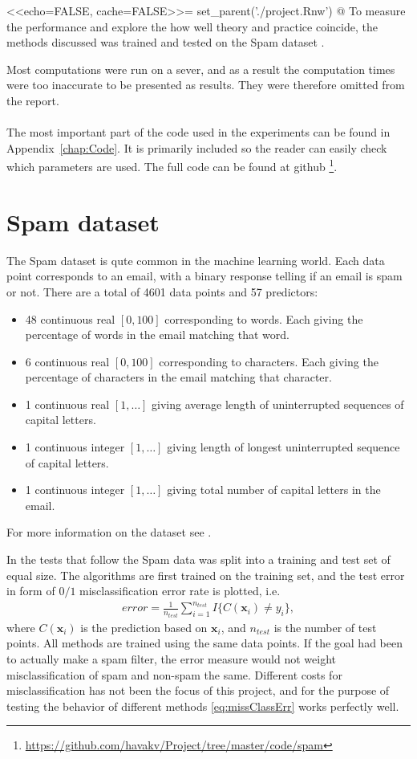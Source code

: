 <<echo=FALSE, cache=FALSE>>=
set_parent('./project.Rnw')
@
%
To measure the performance and explore the how well theory and practice coincide, the methods discussed was trained and tested on the Spam dataset \citep{Spamdata}. 

Most computations were run on a sever, and as a result the computation times were too inaccurate to be presented as results. They were therefore omitted from the report.
\\
\\
The most important part of the code used in the experiments can be found in Appendix~\ref{chap:Code}. It is primarily included so the reader can easily check which parameters are used. The full code can be found at github \footnote{\url{https://github.com/havakv/Project/tree/master/code/spam}}.


\section{Spam dataset}
\label{sec:Spam dataset}
 The Spam dataset is qute common in the machine learning world. 
 Each data point corresponds to an email, with a binary response telling if an email is spam or not. There are a total of 4601 data points and 57 predictors:
 \begin{itemize}
   \item 48 continuous real $[0, 100]$ corresponding to words. Each giving the percentage of words in the email matching that word. 
   \item 6 continuous real $[0, 100]$ corresponding to characters. Each giving the percentage of characters in the email matching that character.
   \item 1 continuous real $[1, \ldots]$ giving average length of uninterrupted sequences of capital letters. 
   \item 1 continuous integer $[1, \ldots]$ giving length of longest uninterrupted sequence of capital letters.
   \item 1 continuous integer $[1, \ldots]$ giving total number of capital letters in the email.
 \end{itemize}
 For more information on the dataset see \cite{Spamdata}.

 In the tests that follow the Spam data was split into a training and test set of equal size. The algorithms are first trained on the training set, and the test error in form of $0/1$ misclassification error rate is plotted, i.e.
 \begin{align}
   \label{eq:missClassErr} 
   error =  \frac{1}{n_{test}} \sum_{i = 1}^{n_{test}} I\{C(\mathbf{x}_i) \neq y_i\},
 \end{align}
 where $C(\mathbf{x}_i)$ is the prediction based on $\mathbf{x}_i$, and $n_{test}$ is the number of test points. 
All methods are trained using the same data points. 
If the goal had been to actually make a spam filter, the error measure would not weight misclassification of spam and non-spam the same. Different costs for misclassification has not been the focus of this project, and for the purpose of testing the behavior of different methods \eqref{eq:missClassErr} works perfectly well.


